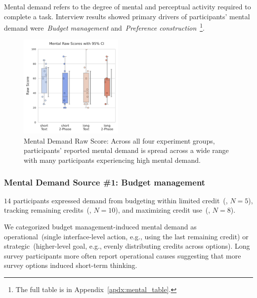 Mental demand refers to the degree of mental and perceptual activity required to complete a task. Interview results showed primary drivers of participants' mental demand were~\textit{Budget management} and~\textit{Preference construction}~\footnote{The full table is in Appendix~\ref{apdx:mental_table}.}. %

\begin{figure} %
   \centering
    \includegraphics[width=0.45\textwidth, trim=0 13 0 13, clip]{content/image/cog/Mental_scores.pdf}
    \captionsetup{width=0.4\textwidth, justification=justified}
    \caption{Mental Demand Raw Score: Across all four experiment groups, participants' reported mental demand is spread across a wide range with many participants experiencing high mental demand.}
    \label{fig:mental_cog_score}
\end{figure}

\subsubsection{Mental Demand Source \#1: Budget management} $14$ participants expressed demand from budgeting within limited credit~(, $N=5$), tracking remaining credits~(, $N=10$), and maximizing credit use~(, $N=8$).

We categorized budget management-induced mental demand as operational~(single interface-level action, e.g., using the last remaining credit) or strategic~(higher-level goal, e.g., evenly distributing credits across options). Long survey participants more often report operational causes suggesting that more survey options induced short-term thinking.

